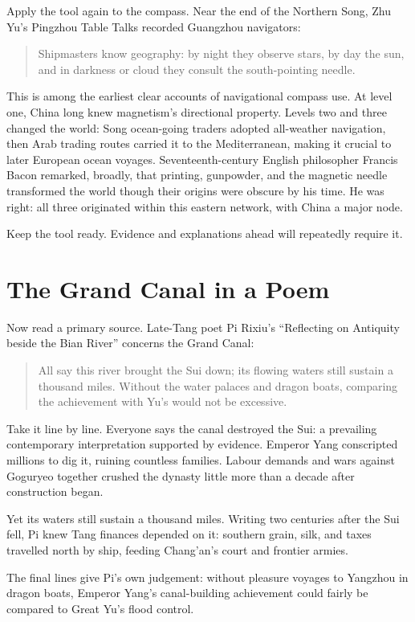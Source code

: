 Apply the tool again to the compass. Near the end of the Northern Song, Zhu Yu's Pingzhou Table Talks recorded Guangzhou navigators:

\begin{quote}
Shipmasters know geography: by night they observe stars, by day the sun, and in darkness or cloud they consult the south-pointing needle.
\end{quote}
This is among the earliest clear accounts of navigational compass use. At level one, China long knew magnetism's directional property. Levels two and three changed the world: Song ocean-going traders adopted all-weather navigation, then Arab trading routes carried it to the Mediterranean, making it crucial to later European ocean voyages. Seventeenth-century English philosopher Francis Bacon remarked, broadly, that printing, gunpowder, and the magnetic needle transformed the world though their origins were obscure by his time. He was right: all three originated within this eastern network, with China a major node.

Keep the tool ready. Evidence and explanations ahead will repeatedly require it.

\section{The Grand Canal in a Poem}
Now read a primary source. Late-Tang poet Pi Rixiu's ``Reflecting on Antiquity beside the Bian River'' concerns the Grand Canal:

\begin{quote}
All say this river brought the Sui down; its flowing waters still sustain a thousand miles. Without the water palaces and dragon boats, comparing the achievement with Yu's would not be excessive.
\end{quote}
Take it line by line. Everyone says the canal destroyed the Sui: a prevailing contemporary interpretation supported by evidence. Emperor Yang conscripted millions to dig it, ruining countless families. Labour demands and wars against Goguryeo together crushed the dynasty little more than a decade after construction began.

Yet its waters still sustain a thousand miles. Writing two centuries after the Sui fell, Pi knew Tang finances depended on it: southern grain, silk, and taxes travelled north by ship, feeding Chang'an's court and frontier armies.

The final lines give Pi's own judgement: without pleasure voyages to Yangzhou in dragon boats, Emperor Yang's canal-building achievement could fairly be compared to Great Yu's flood control.

